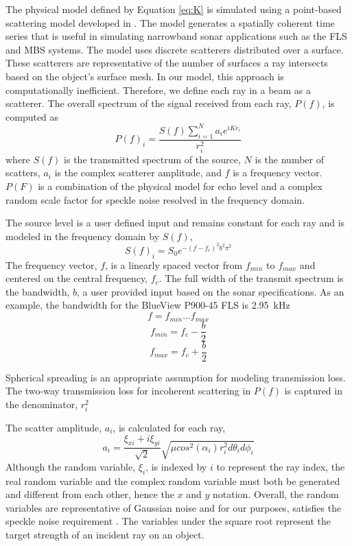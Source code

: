 \documentclass[11pt]{article}
\begin{document}
The physical model defined by Equation \ref{eq:K} is simulated using a point-based scattering model developed in \cite{brown17point}. The model generates a spatially coherent time series that is useful in simulating narrowband sonar applications such as the FLS and MBS systems. The model uses discrete scatterers distributed over a surface. These scatterers are representative of the number of surfaces a ray intersects based on the object's surface mesh. In our model, this approach is computationally inefficient. Therefore, we define each ray in a beam as a scatterer. The overall spectrum of the signal received from each ray, $P(f)$, is computed as
\begin{equation}
    P(f)_i = \frac{S(f)\sum^N_{i=1}a_ie^{iKr_i}}{r_i^2}
\end{equation}
where $S(f)$ is the transmitted spectrum of the source, $N$ is the number of scatters, $a_i$ is the complex scatterer amplitude, and $f$ is a frequency vector. $P(F)$ is a combination of the physical model for echo level and a complex random scale factor for speckle noise resolved in the frequency domain.

The source level is a user defined input and remains constant for each ray and is modeled in the frequency domain by $S(f)$,
\begin{equation}
    S(f)_i = S_0e^{-(f-f_c)^2b^2\pi^2}
\end{equation}
The frequency vector, $f$, is a linearly spaced vector from $f_{min}$ to $f_{max}$ and centered on the central frequency, $f_c$. The full width of the transmit spectrum is the bandwidth, $b$, a user provided input based on the sonar specifications. As an example, the bandwidth for the BlueView P900-45 FLS is \SI{2.95}{\kHz}
\begin{equation}
    f=f_{min} ... f_{max}
\end{equation}
\begin{equation}
    f_{min} = f_c - \frac{b}{2}
\end{equation}
\begin{equation}
    f_{max} = f_c + \frac{b}{2}
\end{equation}

Spherical spreading is an appropriate assumption for modeling transmission loss. The two-way transmission loss for incoherent scattering in $P(f)$ is captured in the denominator, $r_i^2$

The scatter amplitude, $a_i$, is calculated for each ray,
\begin{equation}
    a_i = \frac{\xi_{xi} + i \xi_{yi}}{\sqrt{2}}\sqrt{\mu cos^2(\alpha_i)r_i^2d\theta_id\phi_i}
\end{equation}
Although the random variable, $\xi_i$, is indexed by $i$ to represent the ray index, the real random variable and the complex random variable must both be generated and different from each other, hence the $x$ and $y$ notation. Overall, the random variables are representative of Gaussian noise and for our purposes, satisfies the speckle noise requirement \cite{brown17point}. The variables under the square root represent the target strength of an incident ray on an object.
\end{document}

